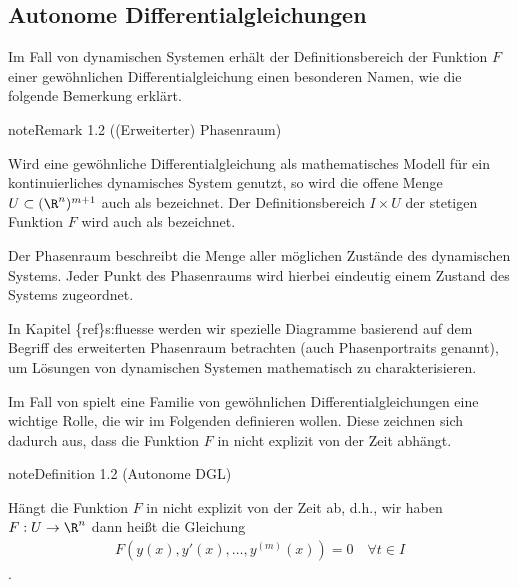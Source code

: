 \documentclass[letterpaper,10pt,english]{jupyterBook}
\begin{document}
\subsection{Autonome Differentialgleichungen}
\label{\detokenize{ode/repetition:autonome-differentialgleichungen}}
\sphinxAtStartPar
Im Fall von dynamischen Systemen erhält der Definitionsbereich der Funktion \(F\) einer gewöhnlichen Differentialgleichung einen besonderen Namen, wie die folgende Bemerkung erklärt.
\label{ode/repetition:remark-2}
\begin{sphinxadmonition}{note}{Remark 1.2 ((Erweiterter) Phasenraum)}



\sphinxAtStartPar
Wird eine gewöhnliche Differentialgleichung als mathematisches Modell für ein kontinuierliches dynamisches System genutzt, so wird die offene Menge \(U\subset (\R^n)^{m+1}\) auch als  bezeichnet.
Der Definitionsbereich \(I\times U\) der stetigen Funktion \(F\) wird auch als  bezeichnet.

\sphinxAtStartPar
Der Phasenraum beschreibt die Menge aller möglichen Zustände des dynamischen Systems.
Jeder Punkt des Phasenraums wird hierbei eindeutig einem Zustand des Systems zugeordnet.

\sphinxAtStartPar
In Kapitel \{ref\}s:fluesse werden wir spezielle Diagramme basierend auf dem Begriff des erweiterten Phasenraum betrachten (auch Phasenportraits genannt), um Lösungen von dynamischen Systemen mathematisch zu charakterisieren.
\end{sphinxadmonition}

\sphinxAtStartPar
Im Fall von  spielt eine Familie von gewöhnlichen Differentialgleichungen eine wichtige Rolle, die wir im Folgenden definieren wollen.
Diese zeichnen sich dadurch aus, dass die Funktion \(F\) in {\hyperref[\detokenize{ode/repetition:equation-eq-dgl-time}]{}} nicht explizit von der Zeit abhängt.
\label{ode/repetition:definition-3}
\begin{sphinxadmonition}{note}{Definition 1.2 (Autonome DGL)}



\sphinxAtStartPar
Hängt die Funktion \(F\) in {\hyperref[\detokenize{ode/repetition:def:DGL}]{}} nicht explizit von der Zeit ab, d.h., wir haben \(F:U\rightarrow\R^n\) dann heißt die Gleichung
\begin{equation}\label{equation:ode/repetition:eq:autonome_DGL}
\begin{split}F(y(x), y'(x), \ldots, y^{(m)}(x)) = 0 \quad \forall t\in I\end{split}
\end{equation}
\sphinxAtStartPar
{}.
\end{sphinxadmonition}
\end{document}
